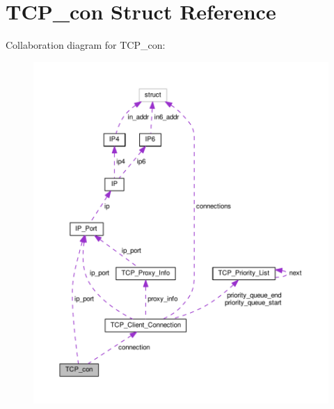 \hypertarget{struct_t_c_p__con}{\section{T\+C\+P\+\_\+con Struct Reference}
\label{struct_t_c_p__con}
}


Collaboration diagram for T\+C\+P\+\_\+con\+:\nopagebreak
\begin{figure}[H]
\begin{center}
\leavevmode
\includegraphics[width=350pt]{struct_t_c_p__con__coll__graph}
\end{center}
\end{figure}
